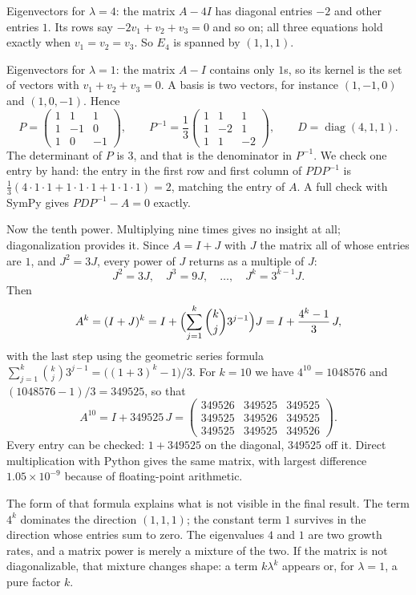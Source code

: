 Eigenvectors for $\lambda=4$: the matrix $A-4I$ has diagonal entries $-2$ and other entries $1$.
Its rows say $-2v_{1}+v_{2}+v_{3}=0$ and so on; all three equations hold exactly when
$v_{1}=v_{2}=v_{3}$. So $E_{4}$ is spanned by $(1,1,1)$.

Eigenvectors for $\lambda=1$: the matrix $A-I$ contains only $1$s, so its kernel is the set of
vectors with $v_{1}+v_{2}+v_{3}=0$. A basis is two vectors, for instance $(1,-1,0)$ and
$(1,0,-1)$. Hence
\[
  P=\begin{pmatrix}1&1&1\\ 1&-1&0\\ 1&0&-1\end{pmatrix},\qquad
  P^{-1}=\frac{1}{3}\begin{pmatrix}1&1&1\\ 1&-2&1\\ 1&1&-2\end{pmatrix},\qquad
  D=\operatorname{diag}(4,1,1).
\]
The determinant of $P$ is $3$, and that is the denominator in $P^{-1}$. We check one entry by
hand: the entry in the first row and first column of $PDP^{-1}$ is
$\tfrac{1}{3}(4\cdot1\cdot1+1\cdot1\cdot1+1\cdot1\cdot1)=2$, matching the entry of $A$. A full
check with SymPy gives $PDP^{-1}-A=0$ exactly.

Now the tenth power. Multiplying nine times gives no insight at all;
diagonalization provides it. Since $A=I+J$ with $J$ the matrix all of whose entries are $1$, and
$J^{2}=3J$, every power of $J$ returns as a multiple of $J$:
\[
  J^{2}=3J,\quad J^{3}=9J,\quad\dots,\quad J^{k}=3^{k-1}J .
\]
Then
\[
  A^{k}=(I+J)^{k}=I+\Bigl(\sum_{j=1}^{k}\binom{k}{j}3^{j-1}\Bigr)J
  =I+\frac{4^{k}-1}{3}\,J,
\]
with the last step using the geometric series formula
$\sum_{j=1}^{k}\binom{k}{j}3^{j-1}=\bigl((1+3)^{k}-1\bigr)/3$. For $k=10$ we have
$4^{10}=1048576$ and $(1048576-1)/3=349525$, so that
\[
  A^{10}=I+349525\,J=
  \begin{pmatrix}349526&349525&349525\\ 349525&349526&349525\\ 349525&349525&349526\end{pmatrix}.
\]
Every entry can be checked: $1+349525$ on the diagonal, $349525$ off it. Direct multiplication
with Python gives the same matrix, with largest difference $1.05\times10^{-9}$ because of
floating-point arithmetic.

The form of that formula explains what is not visible in the final result. The term $4^{k}$
dominates the direction $(1,1,1)$; the constant term $1$ survives in the direction whose entries
sum to zero. The eigenvalues $4$ and $1$ are two growth rates, and a matrix power is merely a
mixture of the two. If the matrix is not diagonalizable, that mixture changes shape: a term
$k\lambda^{k}$ appears or, for $\lambda=1$, a pure factor $k$.

